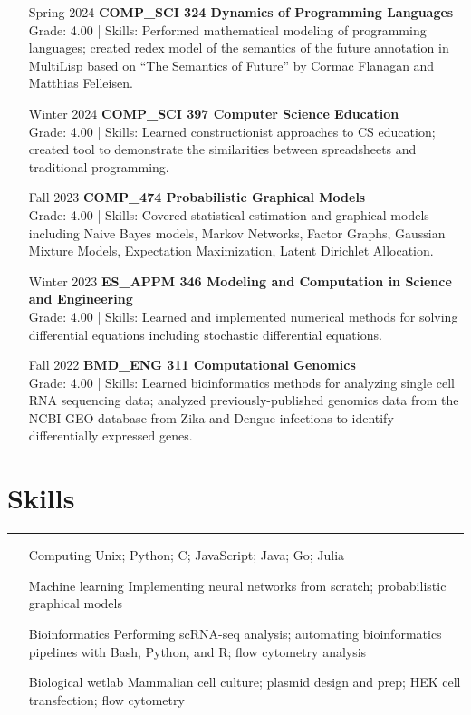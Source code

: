 \documentclass{article}
\begin{document}
\begin{itemize}[leftmargin=1.5in]
    \item[Spring 2024] \textbf{COMP\_SCI 324 Dynamics of Programming Languages}\\
    Grade: 4.00 | Skills: Performed mathematical modeling of programming languages; created redex model of the semantics of the future annotation in MultiLisp based on ``The Semantics of Future'' by Cormac Flanagan and Matthias Felleisen.
    \item[Winter 2024] \textbf{COMP\_SCI 397 Computer Science Education}\\
    Grade: 4.00 | Skills: Learned constructionist approaches to CS education; created tool to demonstrate the similarities between spreadsheets and traditional programming.
    \item[Fall 2023] \textbf{COMP\_474 Probabilistic Graphical Models}\\
    Grade: 4.00 | Skills: Covered statistical estimation and graphical models including Naive Bayes models, Markov Networks, Factor Graphs, Gaussian Mixture Models, Expectation Maximization, Latent Dirichlet Allocation.
    \item[Winter 2023] \textbf{ES\_APPM 346 Modeling and Computation in Science and Engineering}\\
    Grade: 4.00 | Skills: Learned and implemented numerical methods for solving differential equations including stochastic differential equations.
    \item[Fall 2022] \textbf{BMD\_ENG 311 Computational Genomics}\\
    Grade: 4.00 | Skills: Learned bioinformatics methods for analyzing single cell RNA sequencing data; analyzed previously-published genomics data from the NCBI GEO database from Zika and Dengue infections to identify differentially expressed genes.
\end{itemize}

\section*{Skills}
\hrule
\vspace{10pt}

\begin{itemize}[leftmargin=1.5in]
    \item[Computing] Unix; Python; C; JavaScript; Java; Go; Julia
    \item[Machine learning] Implementing neural networks from scratch; probabilistic graphical models
    \item[Bioinformatics] Performing scRNA-seq analysis; automating bioinformatics pipelines with Bash, Python, and R; flow cytometry analysis
    \item[Biological wetlab] Mammalian cell culture; plasmid design and prep; HEK cell transfection; flow cytometry
\end{itemize}
\end{document}
